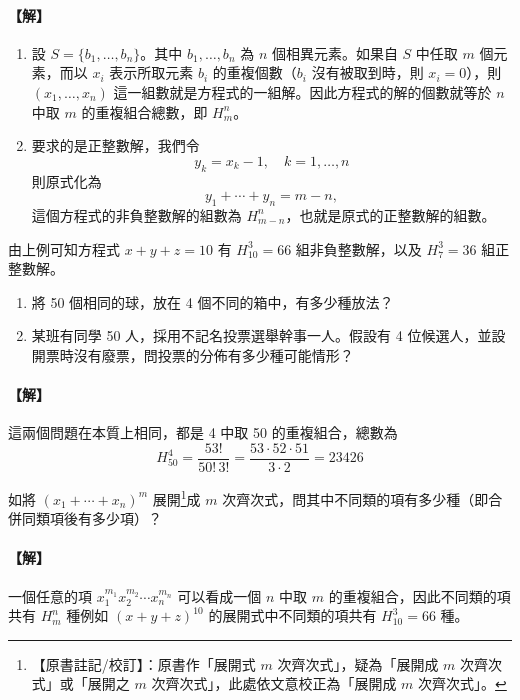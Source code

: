 \paragraph{【解】}
\begin{enumerate}[label=(\roman*), topsep=2pt, itemsep=4pt]
  \item 設 $S = \{b_1, \ldots, b_n\}$。其中 $b_1, \ldots, b_n$ 為 $n$ 個相異元素。如果自 $S$ 中任取 $m$ 個元素，而以 $x_i$ 表示所取元素 $b_i$ 的重複個數（$b_i$ 沒有被取到時，則 $x_i = 0$），則 $(x_1, \ldots, x_n)$ 這一組數就是方程式的一組解。因此方程式的解的個數就等於 $n$ 中取 $m$ 的重複組合總數，即 $H_m^n$。
  \item 要求的是正整數解，我們令
  \[
  y_k = x_k - 1, \quad k = 1, \ldots, n
  \]
  則原式化為
  \[
  y_1 + \cdots + y_n = m - n,
  \]
  這個方程式的非負整數解的組數為 $H_{m-n}^n$，也就是原式的正整數解的組數。
\end{enumerate}
由上例可知方程式 $x + y + z = 10$ 有 $H_{10}^3 = 66$ 組非負整數解，以及 $H_7^3 = 36$ 組正整數解。

\medskip
\begin{example}\label{ex:b5s-2-18}
\begin{enumerate}[label=(\roman*), topsep=2pt, itemsep=4pt]
  \item 將 50 個相同的球，放在 4 個不同的箱中，有多少種放法？
  \item 某班有同學 50 人，採用不記名投票選舉幹事一人。假設有 4 位候選人，並設開票時沒有廢票，問投票的分佈有多少種可能情形？
\end{enumerate}
\end{example}
\paragraph{【解】}
這兩個問題在本質上相同，都是 4 中取 50 的重複組合，總數為
\[
H_{50}^4 = \frac{53!}{50!\, 3!} = \frac{53 \cdot 52 \cdot 51}{3 \cdot 2} = 23426 \tag*{\#}
\]

\medskip
\begin{discussion}\label{disc:b5s-2-10}
如將 $(x_1 + \cdots + x_n)^m$ 展開\label{note:b5s-ch2-p83-zhankai}\footnote{【原書註記/校訂】：原書作「展開式 $m$ 次齊次式」，疑為「展開成 $m$ 次齊次式」或「展開之 $m$ 次齊次式」，此處依文意校正為「展開成 $m$ 次齊次式」。}成 $m$ 次齊次式，問其中不同類的項有多少種（即合併同類項後有多少項）？
\end{discussion}
\paragraph{【解】}
一個任意的項 $x_1^{m_1} x_2^{m_2} \cdots x_n^{m_n}$ 可以看成一個 $n$ 中取 $m$ 的重複組合，因此不同類的項共有 $H_m^n$ 種例如 $(x + y + z)^{10}$ 的展開式中不同類的項共有 $H_{10}^3 = 66$ 種。

